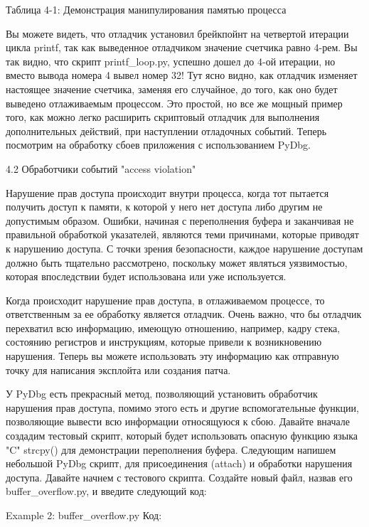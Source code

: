 \documentclass[12pt, a4paper, oneside]{book}
\begin{document}
Таблица 4-1: Демонстрация манипулирования памятью процесса

Вы можете видеть, что отладчик установил брейкпойнт на четвертой итерации цикла printf, так как выведенное отладчиком значение счетчика равно 4-рем. Вы так видно, что скрипт printf\_loop.py, успешно дошел до 4-ой итерации, но вместо вывода номера 4 вывел номер 32! Тут ясно видно, как отладчик изменяет настоящее значение счетчика, заменяя его случайное, до того, как оно будет выведено отлаживаемым процессом. Это простой, но все же мощный пример того, как можно легко расширить скриптовый отладчик для выполнения дополнительных действий, при наступлении отладочных событий. Теперь посмотрим на обработку сбоев приложения с использованием PyDbg.


4.2 Обработчики событий "access violation"

Нарушение прав доступа происходит внутри процесса, когда тот пытается получить доступ к памяти, к которой у него нет доступа либо другим не допустимым образом. Ошибки, начиная с переполнения буфера и заканчивая не правильной обработкой указателей, являются теми причинами, которые приводят к нарушению доступа. С точки зрения безопасности, каждое нарушение доступам должно быть тщательно рассмотрено, поскольку может являться уязвимостью, которая впоследствии будет использована или уже используется. 

Когда происходит нарушение прав доступа, в отлаживаемом процессе, то ответственным за ее обработку является отладчик. Очень важно, что бы отладчик перехватил всю информацию, имеющую отношению, например, кадру стека, состоянию регистров и инструкциям, которые привели к возникновению нарушения. Теперь вы можете использовать эту информацию как отправную точку для написания эксплойта или создания патча.

У PyDbg есть прекрасный метод, позволяющий установить обработчик нарушения прав доступа, помимо этого есть и другие вспомогательные функции, позволяющие вывести всю информации относящуюся к сбою. Давайте вначале создадим тестовый скрипт, который будет использовать опасную функцию языка "C" strcpy() для демонстрации переполнения буфера. Следующим напишем небольшой PyDbg скрипт, для присоединения (attach) и обработки нарушения доступа. Давайте начнем с тестового скрипта. Создайте новый файл, назвав его buffer\_overflow.py, и введите следующий код:

Example 2: buffer\_overflow.py
Код:

\end{document}
